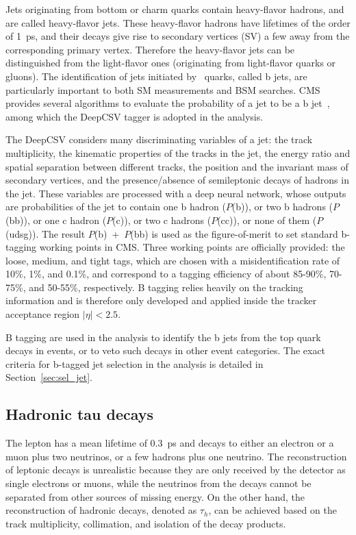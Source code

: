 Jets originating from bottom or charm quarks contain heavy-flavor hadrons, and are called heavy-flavor jets.
These heavy-flavor hadrons have lifetimes of the order of 1~ps, and their decays give rise to secondary vertices (SV) a few \mm away from the corresponding primary vertex. 
Therefore the heavy-flavor jets can be distinguished from the light-flavor ones (originating from light-flavor quarks or gluons).
The identification of jets initiated by \Pqb~quarks, called b jets, are particularly important to both SM measurements and BSM searches.
CMS provides several algorithms to evaluate the probability of a jet to be a b jet~\cite{Sirunyan:2017ezt}, among which the DeepCSV tagger is adopted in the \hmm analysis.

The DeepCSV considers many discriminating variables of a jet: the track multiplicity, the kinematic properties of the tracks in the jet,
the energy ratio and spatial separation between different tracks, the position and the invariant mass of secondary vertices, 
and the presence/absence of semileptonic decays of hadrons in the jet.
These variables are processed with a deep neural network, whose outputs are probabilities of the jet to contain one b hadron ($P$(b)), or two b hadrons ($P$(bb)),
or one c hadron ($P$(c)), or two c hadrons ($P$(cc)), or none of them ($P$(udsg)).  
The result $P$(b)~+~$P$(bb) is used as the figure-of-merit to set standard b-tagging working points in CMS.
Three working points are officially provided: the loose, medium, and tight tags, 
which are chosen with a misidentification rate of 10\%, 1\%, and 0.1\%, 
and correspond to a tagging efficiency of about 85-90\%, 70-75\%, and 50-55\%, respectively.
B tagging relies heavily on the tracking information and is therefore only developed and applied inside the tracker acceptance region $|\eta| < 2.5$.

B tagging are used in the \hmm analysis to identify the b jets from the top quark decays in \ttH events, 
or to veto such decays in other event categories.
The exact criteria for b-tagged jet selection in the \hmm analysis is detailed in Section~\ref{sec:sel_jet}.

\subsection{Hadronic tau decays}\label{sec:reco_tau}

The \tau{} lepton has a mean lifetime of 0.3~ps and decays to either an electron or a muon plus two neutrinos, or a few hadrons plus one neutrino.
The reconstruction of leptonic \tau{} decays is unrealistic because they are only received by the detector as single electrons or muons, 
while the neutrinos from the decays cannot be separated from other sources of missing energy.
On the other hand, the reconstruction of hadronic \tau{} decays, denoted as $\tau_{h}$, can be achieved based on the track multiplicity, collimation, and isolation of the decay products.  

